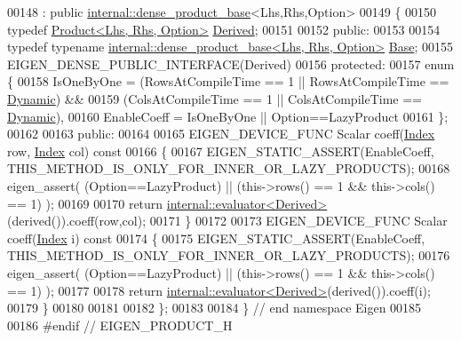 \begin{DoxyCode}
00148   : \textcolor{keyword}{public} \hyperlink{class_eigen_1_1internal_1_1dense__product__base}{internal::dense\_product\_base}<Lhs,Rhs,Option>
00149 \{
00150     \textcolor{keyword}{typedef} \hyperlink{group___core___module_class_eigen_1_1_product}{Product<Lhs, Rhs, Option>} \hyperlink{group___core___module_class_eigen_1_1_product}{Derived};
00151     
00152   \textcolor{keyword}{public}:
00153     
00154     \textcolor{keyword}{typedef} \textcolor{keyword}{typename} \hyperlink{class_eigen_1_1internal_1_1dense__product__base}{internal::dense\_product\_base<Lhs, Rhs, Option>}
       \hyperlink{class_eigen_1_1internal_1_1dense__product__base}{Base};
00155     EIGEN\_DENSE\_PUBLIC\_INTERFACE(Derived)
00156   \textcolor{keyword}{protected}:
00157     \textcolor{keyword}{enum} \{
00158       IsOneByOne = (RowsAtCompileTime == 1 || RowsAtCompileTime == \hyperlink{namespace_eigen_ad81fa7195215a0ce30017dfac309f0b2}{Dynamic}) && 
00159                    (ColsAtCompileTime == 1 || ColsAtCompileTime == \hyperlink{namespace_eigen_ad81fa7195215a0ce30017dfac309f0b2}{Dynamic}),
00160       EnableCoeff = IsOneByOne || Option==LazyProduct
00161     \};
00162     
00163   \textcolor{keyword}{public}:
00164   
00165     EIGEN\_DEVICE\_FUNC Scalar coeff(\hyperlink{namespace_eigen_a62e77e0933482dafde8fe197d9a2cfde}{Index} row, \hyperlink{namespace_eigen_a62e77e0933482dafde8fe197d9a2cfde}{Index} col)\textcolor{keyword}{ const}
00166 \textcolor{keyword}{    }\{
00167       EIGEN\_STATIC\_ASSERT(EnableCoeff, THIS\_METHOD\_IS\_ONLY\_FOR\_INNER\_OR\_LAZY\_PRODUCTS);
00168       eigen\_assert( (Option==LazyProduct) || (this->rows() == 1 && this->cols() == 1) );
00169       
00170       \textcolor{keywordflow}{return} \hyperlink{struct_eigen_1_1internal_1_1evaluator}{internal::evaluator<Derived>}(derived()).coeff(row,col);
00171     \}
00172 
00173     EIGEN\_DEVICE\_FUNC Scalar coeff(\hyperlink{namespace_eigen_a62e77e0933482dafde8fe197d9a2cfde}{Index} i)\textcolor{keyword}{ const}
00174 \textcolor{keyword}{    }\{
00175       EIGEN\_STATIC\_ASSERT(EnableCoeff, THIS\_METHOD\_IS\_ONLY\_FOR\_INNER\_OR\_LAZY\_PRODUCTS);
00176       eigen\_assert( (Option==LazyProduct) || (this->rows() == 1 && this->cols() == 1) );
00177       
00178       \textcolor{keywordflow}{return} \hyperlink{struct_eigen_1_1internal_1_1evaluator}{internal::evaluator<Derived>}(derived()).coeff(i);
00179     \}
00180     
00181   
00182 \};
00183 
00184 \} \textcolor{comment}{// end namespace Eigen}
00185 
00186 \textcolor{preprocessor}{#endif // EIGEN\_PRODUCT\_H}
\end{DoxyCode}
